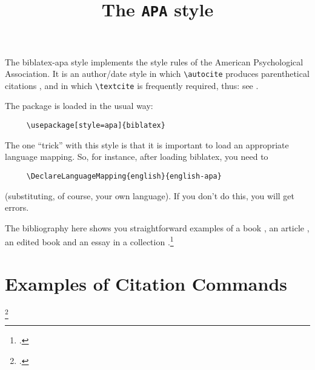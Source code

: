 \documentclass{article}
\begin{document}
\title{The \texttt{APA} style}
\author{}\date{}
\maketitle
\thispagestyle{empty}


\noindent The \textsf{biblatex-apa} style implements the style rules of the American Psychological Association. It is an author/date style in which \verb~\autocite~ produces parenthetical citations \autocite{worman, reese}, and in which \verb~\textcite~ is frequently required, thus: see \textcite{worman}.

The package is loaded in the usual way:
\begin{verbatim}
     \usepackage[style=apa]{biblatex}
\end{verbatim}
The one \enquote{trick} with this style is that it is important to load an appropriate language mapping. So, for instance, after loading \textsf{biblatex}, you need to
\begin{verbatim}
     \DeclareLanguageMapping{english}{english-apa}
\end{verbatim}
(substituting, of course, your own language). If you don't do this, you will get errors.

The bibliography here shows you straightforward examples of a book \autocite{worman}, an article \autocite{reese}, an edited book \autocite{aristotle:anima} and an essay in a collection \autocite{gaonkar:in}.\footcite{worman}

\section{Examples of Citation Commands}

\begin{description}[font=\ttfamily]
\item[\textbackslash cite\{worman\}:] \cite{worman}
\item[\textbackslash autocite\{worman\}:] \autocite{worman}
\item[\textbackslash textcite\{worman\}:] \textcite{worman}
\item[\textbackslash footcite\{worman\}:] \strut\footcite{worman}
\end{description}

\printbibliography
\end{document}
